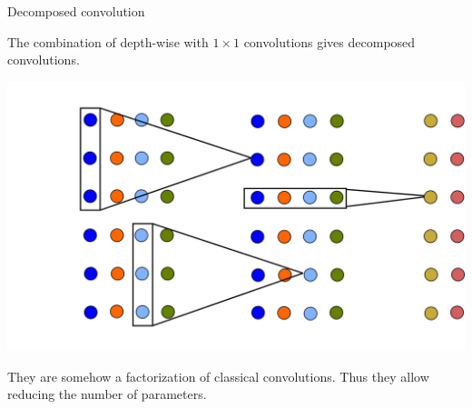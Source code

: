 \documentclass[xcolor=pdftex,dvipsnames,table,mathserif]{beamer}
\begin{document}
\begin{frame}{Decomposed convolution}

  The combination of depth-wise with $1 \times 1$ convolutions gives decomposed convolutions.

  \begin{center}
    \includegraphics[height=0.51\textheight]{conv_dec.png}
  \end{center}

  They are somehow a factorization of classical convolutions. Thus they allow reducing the number of parameters.

\end{frame}
\end{document}
